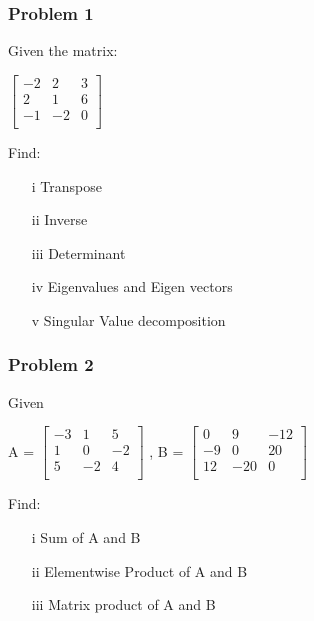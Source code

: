 \documentclass[14pt,compress]{beamer}
\begin{document}
\begin{frame}[fragile]
\frametitle{Problem 1}
Given the matrix:\\
\begin{center}
$\begin{bmatrix}
-2 & 2 & 3\\
 2 & 1 & 6\\
-1 &-2 & 0\\
\end{bmatrix}$
\end{center}
Find:
\begin{itemize}
  \item[i] Transpose
  \item[ii]Inverse
  \item[iii]Determinant
  \item[iv] Eigenvalues and Eigen vectors
  \item[v] Singular Value decomposition
\end{itemize}
\end{frame}

\begin{frame}[fragile]
\frametitle{Problem 2}
Given 
\begin{center}
A = 
$\begin{bmatrix}
-3 & 1 & 5 \\
1 & 0 & -2 \\
5 & -2 & 4 \\
\end{bmatrix}$
, B = 
$\begin{bmatrix}
0 & 9 & -12 \\
-9 & 0 & 20 \\
12 & -20 & 0 \\
\end{bmatrix}$
\end{center}
Find:
\begin{itemize}
  \item[i] Sum of A and B
  \item[ii]Elementwise Product of A and B
  \item[iii] Matrix product of A and B
\end{itemize}
\end{frame}
\end{document}
